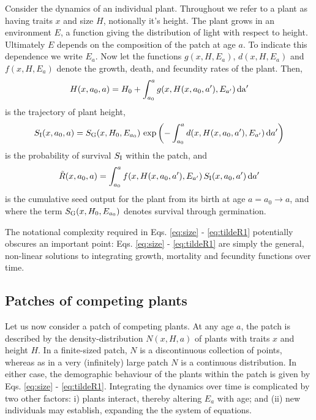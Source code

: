 \documentclass[10pt,twoside]{article}
\begin{document}
Consider the dynamics of an individual plant. Throughout we refer to a
plant as having traits \(x\) and size \(H\), notionally it's height. The
plant grows in an environment \(E\), a function giving the distribution
of light with respect to height. Ultimately \(E\) depends on the
composition of the patch at age \(a\). To indicate this dependence we
write \(E_a\). Now let the functions \(g(x, H, E_a)\), \(d(x, H, E_a)\) and
\(f(x, H, E_a)\) denote the growth, death, and fecundity rates of the
plant. Then,
\begin{equation} \label{eq:size}
  H(x, a_0, a) = H_0 + \int_{a_0}^{a} g(x, H(x, a_0, a^\prime), E_{a^\prime}) \, \rm{d}a^\prime
\end{equation}
is the trajectory of plant height,
\begin{equation} \label{eq:survivalIndividual}
  S_{\rm I} (x, a_0, a) = S_{\rm G} (x, H_0, E_{a_0}) \, \exp\left(- \int_{a_0}^{a} d(x, H(x, a_0, a^\prime), E_{a^\prime}) \, {\rm d} a^\prime \right)
\end{equation}
is the probability of survival \(S_{\rm I}\) within the patch, and
\begin{equation} \label{eq:tildeR1}
  \tilde{R}(x, a_0, a) = \int_{a_0}^{a} f(x, H(x, a_0, a^\prime), E_{a^\prime}) \, S_{\rm I} (x, a_0, a^\prime) \, {\rm d} a^\prime
\end{equation}
is the cumulative seed output for the plant from its birth at age
\(a = a_0 \rightarrow a\), and where the term \(S_{\rm G} (x, H_0, E_{a_0})\)
denotes survival through germination.

The notational complexity required in Eqs. \ref{eq:size} -
\ref{eq:tildeR1} potentially obscures an important point: Eqs.
\ref{eq:size} - \ref{eq:tildeR1} are simply the general, non-linear solutions to
integrating growth, mortality and fecundity functions over time.

\subsection{Patches of competing plants}\label{patches-of-competing-plants-size-structured-populations}

Let us now consider a patch of competing plants. At any age \(a\), the
patch is described by the density-distribution \(N(x, H, a)\) of plants
with traits \(x\) and height \(H\). In a finite-sized patch, \(N\) is a
discontinuous collection of points, whereas as in a very (infinitely) large patch
\(N\) is a continuous distribution. In either case, the demographic
behaviour of the plants within the patch is given by Eqs. \ref{eq:size}
- \ref{eq:tildeR1}. Integrating the dynamics over time is complicated by
two other factors: i) plants interact, thereby altering \(E_a\) with
age; and (ii) new individuals may establish, expanding the the system of
equations.
\end{document}
